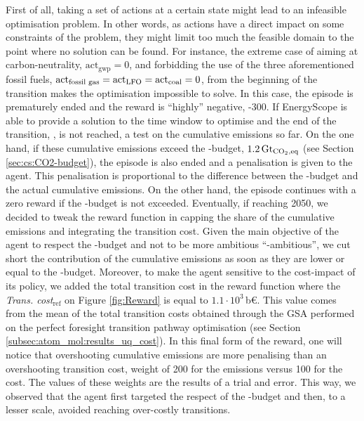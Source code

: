 First of all, taking a set of actions at a certain state might lead to an infeasible optimisation problem. In other words, as actions have a direct impact on some constraints of the problem, they might limit too much the feasible domain to the point where no solution can be found. For instance, the extreme case of aiming at carbon-neutrality, \ie $\mathrm{act}_{\mathrm{gwp}}=0$, and forbidding the use of the three aforementioned fossil fuels, \ie $\mathrm{act}\textsubscript{fossil gas}=\mathrm{act}\textsubscript{LFO}=\mathrm{act}\textsubscript{coal}=0$,  from the beginning of the transition makes the optimisation impossible to solve. In this case, the episode is prematurely ended and the reward is ``highly'' negative, -300. If EnergyScope is able to provide a solution to the time window to optimise and the end of the transition, , is not reached, a test on the cumulative emissions so far. On the one hand, if these cumulative emissions exceed the -budget, $1.2\,\text{Gt}_{\ce{CO2},\text{eq}}$ (see Section \ref{sec:cs:CO2-budget}), the episode is also ended and a penalisation is given to the agent. This penalisation is proportional to the difference between the -budget and the actual cumulative emissions.  On the other hand, the episode continues with a zero reward if the -budget is not exceeded. Eventually, if reaching 2050, we decided to tweak the reward function in capping the share of the cumulative emissions and integrating the transition cost. Given the main objective of the agent to respect the -budget and not to be more ambitious ``-ambitious'', we cut short the contribution of the cumulative emissions as soon as they are lower or equal to the -budget.  Moreover, to make the agent sensitive to the cost-impact of its policy, we added the total transition cost in the reward function where the \emph{Trans. cost$_{\text{ref}}$} on Figure \ref{fig:Reward} is equal to $1.1\cdot10^3$\,b€. This value comes from the mean of the total transition costs obtained through the \gls{GSA} performed on the perfect foresight transition pathway optimisation (see Section \ref{subsec:atom_mol:results_uq_cost}). In this final form of the reward, one will notice that overshooting cumulative emissions are more penalising than an overshooting transition cost, \ie weight of 200 for the emissions versus 100 for the cost. The values of these weights are the results of a trial and error. This way, we observed that the agent first targeted the respect of the -budget and then, to a lesser scale, avoided reaching over-costly transitions.\\

